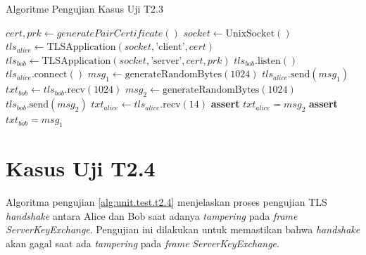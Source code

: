 \begin{algorithm}
  \caption{Algoritme Pengujian Kasus Uji T2.3}
  \label{alg:unit.test.t2.3}
  \begin{algorithmic}
    \State $cert, prk \gets generatePairCertificate()$
    \State $socket \gets \text{UnixSocket}()$ 
    \State $tls_{alice} \gets \text{TLSApplication}(socket, \text{'client'}, cert)$ 
    \State $tls_{bob} \gets \text{TLSApplication}(socket, \text{'server'}, cert, prk)$
    \State
    \State $tls_{bob}.\text{listen}()$  
    \State $tls_{alice}.\text{connect}()$  
    \State
    \State $msg_1 \gets \text{generateRandomBytes}(1024)$
    \State $tls_{alice}.\text{send}(msg_1)$
    \State $txt_{bob} \gets tls_{bob}.\text{recv}(1024)$
    \State
    \State $msg_2 \gets \text{generateRandomBytes}(1024)$
    \State $tls_{bob}.\text{send}(msg_2)$
    \State $txt_{alice} \gets tls_{alice}.\text{recv}(14)$
    \State
    \State \textbf{assert} $txt_{alice} = msg_2$
    \State \textbf{assert} $txt_{bob} = msg_1$
  \end{algorithmic}
\end{algorithm}

\section{Kasus Uji T2.4}

Algoritma pengujian \ref{alg:unit.test.t2.4} menjelaskan proses pengujian TLS \emph{handshake} antara Alice dan Bob saat adanya \emph{tampering} pada \emph{frame} \emph{ServerKeyExchange}. Pengujian ini dilakukan untuk memastikan bahwa \emph{handshake} akan gagal saat ada \emph{tampering} pada \emph{frame} \emph{ServerKeyExchange}. 

